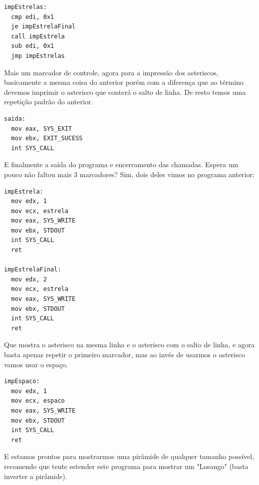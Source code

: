 \begin{lstlisting}[]
impEstrelas:
  cmp edi, 0x1
  je impEstrelaFinal
  call impEstrela
  sub edi, 0x1
  jmp impEstrelas	
\end{lstlisting}

Mais um marcador de controle, agora para a impressão dos asteriscos, basicamente a mesma coisa do anterior porém com a diferença que ao término devemos imprimir o asterisco que conterá o salto de linha. De resto temos uma repetição padrão do anterior.

\begin{lstlisting}[]
saida:
  mov eax, SYS_EXIT
  mov ebx, EXIT_SUCESS
  int SYS_CALL	
\end{lstlisting}

E finalmente a saída do programa e encerramento das chamadas. Espera um pouco não faltou mais 3 marcadores? Sim, dois deles vimos no programa anterior:
\begin{lstlisting}[]
impEstrela:
  mov edx, 1
  mov ecx, estrela
  mov eax, SYS_WRITE
  mov ebx, STDOUT
  int SYS_CALL
  ret

impEstrelaFinal:
  mov edx, 2
  mov ecx, estrela
  mov eax, SYS_WRITE
  mov ebx, STDOUT
  int SYS_CALL
  ret
\end{lstlisting}

Que mostra o asterisco na mesma linha e o asterisco com o salto de linha, e agora basta apenas repetir o primeiro marcador, mas ao invés de usarmos o asterisco vamos usar o espaço.
\begin{lstlisting}[]
impEspaco:
  mov edx, 1
  mov ecx, espaco
  mov eax, SYS_WRITE
  mov ebx, STDOUT
  int SYS_CALL
  ret	
\end{lstlisting}

E estamos prontos para mostrarmos uma pirâmide de qualquer tamanho possível, recomendo que tente estender este programa para mostrar um "Losango" (basta inverter a pirâmide). 

\clearpage